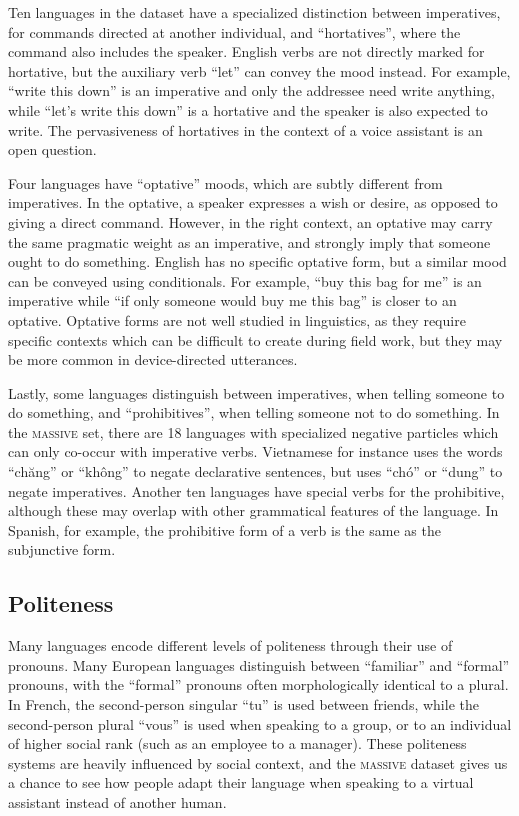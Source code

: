 \documentclass[11pt]{article}
\newcommand{\M}{\textsc{massive}}
\begin{document}
Ten languages in the dataset have a specialized distinction between imperatives, for commands directed at another individual, and ``hortatives'', where the command also includes the speaker.
English verbs are not directly marked for hortative, but the auxiliary verb ``let'' can convey the mood instead.
For example, ``write this down'' is an imperative and only the addressee need write anything, while ``let's write this down'' is a hortative and the speaker is also expected to write.
The pervasiveness of hortatives in the context of a voice assistant is an open question.

Four languages have ``optative'' moods, which are subtly different from imperatives.
In the optative, a speaker expresses a wish or desire, as opposed to giving a direct command.
However, in the right context, an optative may carry the same pragmatic weight as an imperative, and strongly imply that someone ought to do something.
English has no specific optative form, but a similar mood can be conveyed using conditionals.
For example, ``buy this bag for me'' is an imperative while ``if only someone would buy me this bag'' is closer to an optative.
Optative forms are not well studied in linguistics, as they require specific contexts which can be difficult to create during field work, but they may be more common in device-directed utterances.

Lastly, some languages distinguish between imperatives, when telling someone to do something, and ``prohibitives'', when telling someone not to do something.
In the \M{} set, there are 18 languages with specialized negative particles which can only co-occur with imperative verbs.
Vietnamese for instance uses the words ``chăng''  or ``không'' to negate declarative sentences, but uses ``chó'' or ``dung'' to negate imperatives.
Another ten languages have special verbs for the prohibitive, although these may overlap with other grammatical features of the language. In Spanish, for example, the prohibitive form of a verb is the same as the subjunctive form. 

\subsection{Politeness} \label{sect:Politeness}

Many languages encode different levels of politeness through their use of pronouns.
Many European languages distinguish between ``familiar'' and ``formal'' pronouns, with the ``formal'' pronouns often morphologically identical to a plural.
In French, the second-person singular ``tu'' is used between friends, while the second-person plural ``vous'' is used when speaking to a group, or to an individual of higher social rank (such as an employee to a manager).
These politeness systems are heavily influenced by social context, and the \M{} dataset gives us a chance to see how people adapt their language when speaking to a virtual assistant instead of another human. 
\end{document}
